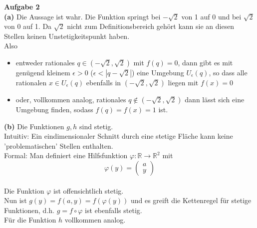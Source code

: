 \documentclass[a4paper,12pt]{article}
\begin{document}
\raggedright
\doublespacing


\noindent\textbf{Aufgabe 2} \\
\noindent\textbf{(a)} Die Aussage ist wahr. 
Die Funktion springt bei $-\sqrt 2$ von 1 auf 0 und bei $\sqrt 2$ von 0 auf 1. Da  $\sqrt 2$ nicht zum Definitionsbereich gehört kann sie an diesen Stellen keinen Unstetigkeitspunkt haben. \\
Also
\begin{itemize}
    \item entweder rationales $q \in (- \sqrt 2, \sqrt 2)$ mit $f(q) =0$, dann gibt es mit genügend kleinem $\epsilon > 0$ ($ \epsilon < |q - \sqrt 2|$) eine Umgebung $U_{\epsilon}(q)$, so dass alle rationalen $x \in U_{\epsilon}(q)$ ebenfalls in $ (- \sqrt 2, \sqrt 2)$ liegen mit $f(x) = 0$
    \item oder, vollkommen analog, rationales $q \notin (- \sqrt 2, \sqrt 2)$ dann lässt sich eine Umgebung finden, sodass $f(q) = f(x) =1$ ist.
\end{itemize}

\noindent\textbf{(b)}
Die Funktionen $g,h$ sind stetig. \\
 Intuitiv: Ein eindimensionaler Schnitt durch eine stetige Fläche kann keine 'problematischen' Stellen enthalten. \\
Formal:
Man definiert eine Hilfsfunktion $\varphi: \mathbb{R} \to \mathbb{R}^2$ mit $$\varphi(y) = \begin{pmatrix} a \\ y \end{pmatrix}$$ \\
Die Funktion $\varphi$ ist offensichtlich stetig. \\
Nun ist $g(y) = f(a,y)= f(\varphi(y))$ und es greift die Kettenregel für stetige Funktionen, d.h. $g = f \circ \varphi $ ist ebenfalls stetig. \\
Für die Funktion $h$ vollkommen analog.
\end{document}
